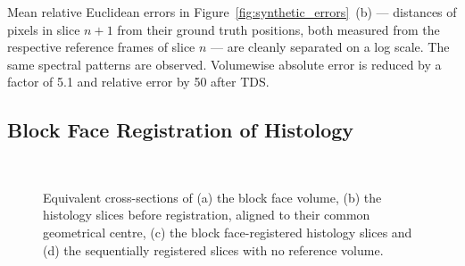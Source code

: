   Mean relative Euclidean errors in Figure~\ref{fig:synthetic_errors}~(b) --- distances of pixels in slice $n+1$ from their ground truth positions, both measured from the respective reference frames of slice $n$ --- are cleanly separated on a log scale. The same spectral patterns are observed. Volumewise absolute error is reduced by a factor of 5.1 and relative error by 50 after TDS.

  \subsection{Block Face Registration of Histology} %
  \label{sub:block_face_registration_of_histology}
  \begin{figure}[!t]
    \centering
    \\
    \caption{Equivalent cross-sections of (a) the block face volume, (b) the histology slices before registration, aligned to their common geometrical centre, (c) the block face-registered histology slices and (d) the sequentially registered slices with no reference volume.}
    \label{fig:block_face_registration}
  \end{figure}
